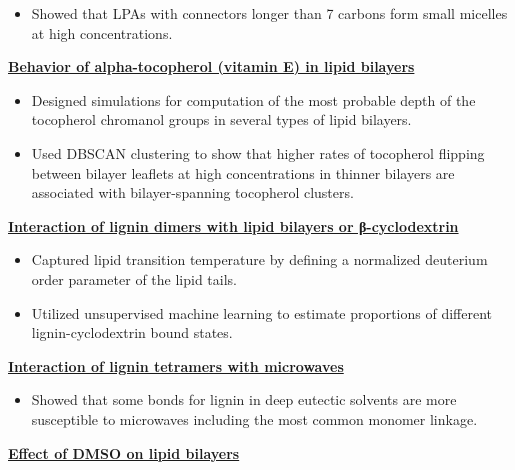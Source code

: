 \begin{cventries}
{\begin{cvitems}
\begin{itemize}
                \item {Showed that LPAs with connectors longer than 7 carbons form small micelles at high concentrations.}
                \end{itemize}
            \item {\textbf{\underline{Behavior of alpha-tocopherol (vitamin E) in lipid bilayers}}}
                \vspace{2pt}
                \begin{itemize}
                \item {Designed simulations for computation of the most probable depth of the tocopherol chromanol groups in several types of lipid bilayers.}
                \item {Used DBSCAN clustering to show that higher rates of tocopherol flipping between bilayer leaflets at high concentrations in thinner bilayers are associated with bilayer-spanning tocopherol clusters.}
                \end{itemize}
            \item {\textbf{\underline{Interaction of lignin dimers with lipid bilayers or β-cyclodextrin}}}
                \vspace{2pt}
                \begin{itemize}
                    \item {Captured lipid transition temperature by defining a normalized deuterium order parameter of the lipid tails.}
                    \item {Utilized unsupervised machine learning to estimate proportions of different lignin-cyclodextrin bound states.}
                \end{itemize}            
            \item {\textbf{\underline{Interaction of lignin tetramers with microwaves}}}
                \vspace{2pt}
                \begin{itemize}
                    \item {Showed that some bonds for lignin in deep eutectic solvents are more susceptible to microwaves including the most common monomer linkage.}
                \end{itemize}   
            \item {\textbf{\underline{Effect of DMSO on lipid bilayers}}}

\end{cvitems}}
\end{cventries}
